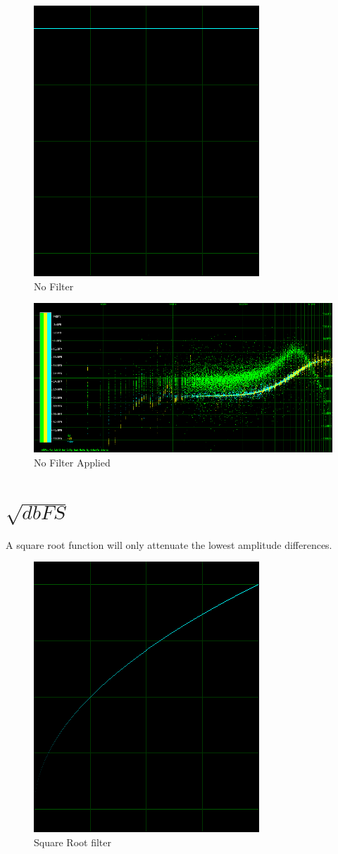 \documentclass[10pt,a4paper]{report}
\begin{document}
\begin{appendices}
\begin{figure}[H]
	\centering
	\includegraphics[width=0.4\linewidth]{images/colorfilter/BetaFunctionPlot_0.png}
	\caption[No Filter]{No Filter}
	\label{fig:betafunctionplot0}
\end{figure}

\begin{figure}[H]
	\centering
	\includegraphics[width=1\linewidth]{images/colorfilter/BetaFunctionPlot_0_Data.png}
	\caption[No Filter]{No Filter Applied}
	\label{fig:betafunctionplot0data}
\end{figure}

\newpage
\section{$\sqrt{dbFS}$} 

A square root function will only attenuate the lowest amplitude differences.

\begin{figure}[H]
	\centering
	\includegraphics[width=0.4\linewidth]{images/colorfilter/BetaFunctionPlot_1.png}
	\caption[Square Root filter]{Square Root filter}
	\label{fig:betafunctionplot1}
\end{figure}


\end{appendices}
\end{document}
